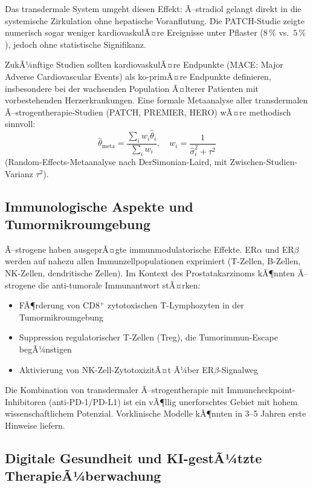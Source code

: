 ﻿\documentclass[a4paper,12pt]{article}
\theoremstyle{definition}
\begin{document}
Das transdermale System umgeht diesen Effekt: Ã–stradiol gelangt direkt in die systemische Zirkulation ohne hepatische Voranflutung.
Die PATCH-Studie zeigte numerisch sogar weniger kardiovaskulÃ¤re Ereignisse unter Pflaster ($8\,\%$ vs.\ $5\,\%$), jedoch ohne statistische Signifikanz.

ZukÃ¼nftige Studien sollten kardiovaskulÃ¤re Endpunkte (MACE: Major Adverse Cardiovascular Events) als ko-primÃ¤re Endpunkte definieren, insbesondere bei der wachsenden Population Ã¤lterer Patienten mit vorbestehenden Herzerkrankungen.
Eine formale Metaanalyse aller transdermalen Ã–strogentherapie-Studien (PATCH, PREMIER, HERO) wÃ¤re methodisch sinnvoll:
\begin{equation}
  \hat{\theta}_{\mathrm{meta}} = \frac{\sum_i w_i \hat{\theta}_i}{\sum_i w_i}, \quad w_i = \frac{1}{\hat{\sigma}_i^2 + \tau^2}
\end{equation}
(Random-Effects-Metaanalyse nach DerSimonian-Laird, mit Zwischen-Studien-Varianz $\tau^2$).

\subsection{Immunologische Aspekte und Tumormikroumgebung}

Ã–strogene haben ausgeprÃ¤gte immunmodulatorische Effekte.
ER$\alpha$ und ER$\beta$ werden auf nahezu allen Immunzellpopulationen exprimiert (T-Zellen, B-Zellen, NK-Zellen, dendritische Zellen).
Im Kontext des Prostatakarzinoms kÃ¶nnten Ã–strogene die anti-tumorale Immunantwort stÃ¤rken:
\begin{itemize}
  \item FÃ¶rderung von CD8$^+$ zytotoxischen T-Lymphozyten in der Tumormikroumgebung
  \item Suppression regulatorischer T-Zellen (Treg), die Tumorimmun-Escape begÃ¼nstigen
  \item Aktivierung von NK-Zell-ZytotoxizitÃ¤t Ã¼ber ER$\beta$-Signalweg
\end{itemize}

Die Kombination von transdermaler Ã–strogentherapie mit Immuncheckpoint-Inhibitoren (anti-PD-1/PD-L1) ist ein vÃ¶llig unerforschtes Gebiet mit hohem wissenschaftlichem Potenzial.
Vorklinische Modelle kÃ¶nnten in 3--5 Jahren erste Hinweise liefern.

\subsection{Digitale Gesundheit und KI-gestÃ¼tzte TherapieÃ¼berwachung}
\end{document}
